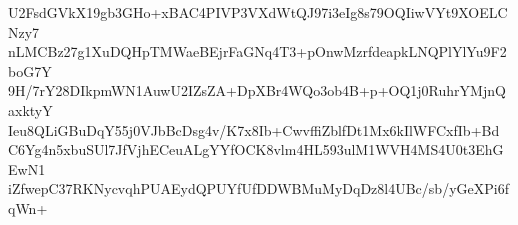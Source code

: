 U2FsdGVkX19gb3GHo+xBAC4PIVP3VXdWtQJ97i3eIg8s79OQIiwVYt9XOELCNzy7
nLMCBz27g1XuDQHpTMWaeBEjrFaGNq4T3+pOnwMzrfdeapkLNQPlYlYu9F2boG7Y
9H/7rY28DIkpmWN1AuwU2IZsZA+DpXBr4WQo3ob4B+p+OQ1j0RuhrYMjnQaxktyY
Ieu8QLiGBuDqY55j0VJbBcDsg4v/K7x8Ib+CwvffiZblfDt1Mx6kIlWFCxfIb+Bd
C6Yg4n5xbuSUl7JfVjhECeuALgYYfOCK8vlm4HL593ulM1WVH4MS4U0t3EhGEwN1
iZfwepC37RKNycvqhPUAEydQPUYfUfDDWBMuMyDqDz8l4UBc/sb/yGeXPi6fqWn+
